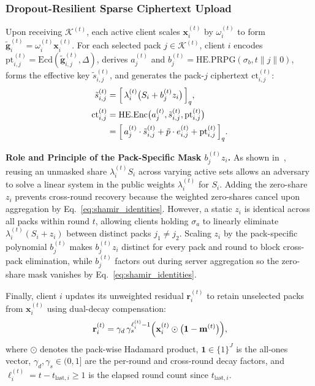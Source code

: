 \subsubsection{Dropout-Resilient Sparse Ciphertext Upload}
Upon receiving $\mathcal{K}^{(t)}$, each active client scales $\mathbf{x}_i^{(t)}$ by $\omega_i^{(t)}$ to form $\tilde{\mathbf{g}}_i^{(t)} = \omega_i^{(t)} \mathbf{x}_i^{(t)}$. For each selected pack $j \in \mathcal{K}^{(t)}$, client $i$ encodes $\mathrm{pt}_{i,j}^{(t)} = \mathrm{Ecd}(\tilde{\mathbf{g}}_{i,j}^{(t)}, \Delta)$, derives $a_j^{(t)}$ and $b_j^{(t)} = \mathrm{HE.PRPG}(\sigma_b, t \parallel j \parallel 0)$, forms the effective key $\tilde{s}_{i,j}^{(t)}$, and generates the pack-$j$ ciphertext $\mathrm{ct}_{i,j}^{(t)}$:
\begin{equation}
\begin{aligned}
\tilde{s}_{i,j}^{(t)} &= \Bigl[\, \lambda_i^{(t)} \bigl(S_i + b_j^{(t)} z_i\bigr) \,\Bigr]_q, \\
\mathrm{ct}_{i,j}^{(t)} &= \mathrm{HE.Enc}\bigl(a_j^{(t)}, \tilde{s}_{i,j}^{(t)}, \mathrm{pt}_{i,j}^{(t)}\bigr) \\
&= \Bigl[\, a_j^{(t)} \cdot \tilde{s}_{i,j}^{(t)} + \tilde{p} \cdot e_{i,j}^{(t)} + \mathrm{pt}_{i,j}^{(t)} \,\Bigr]_q.
\end{aligned}
\label{eq:effective-key-enc}
\end{equation}

\textbf{Role and Principle of the Pack-Specific Mask $b_j^{(t)} z_i$.} As shown in~\cite{colin2026tfhesd}, reusing an unmasked share $\lambda_i^{(t)} S_i$ across varying active sets allows an adversary to solve a linear system in the public weights $\lambda_i^{(t)}$ for $S_i$. Adding the zero-share $z_i$ prevents cross-round recovery because the weighted zero-shares cancel upon aggregation by Eq.~\eqref{eq:shamir_identities}. However, a static $z_i$ is identical across all packs within round $t$, allowing clients holding $\sigma_a$ to linearly eliminate $\lambda_i^{(t)}(S_i + z_i)$ between distinct packs $j_1 \neq j_2$. Scaling $z_i$ by the pack-specific polynomial $b_j^{(t)}$ makes $b_j^{(t)} z_i$ distinct for every pack and round to block cross-pack elimination, while $b_j^{(t)}$ factors out during server aggregation so the zero-share mask vanishes by Eq.~\eqref{eq:shamir_identities}.


Finally, client $i$ updates its unweighted residual $\mathbf{r}_i^{(t)}$ to retain unselected packs from $\mathbf{x}_i^{(t)}$ using dual-decay compensation:
\begin{equation}
\mathbf{r}_i^{(t)} = \gamma_d \,\gamma_s^{\ell_i^{(t)}-1}\Bigl(\mathbf{x}_i^{(t)} \odot \bigl(\mathbf{1} - \mathbf{m}^{(t)}\bigr)\Bigr),
\label{eq:dual-residual-update}
\end{equation}
where $\odot$ denotes the pack-wise Hadamard product, $\mathbf{1} \in \{1\}^J$ is the all-ones vector, $\gamma_d, \gamma_s \in (0, 1]$ are the per-round and cross-round decay factors, and $\ell_i^{(t)} = t - t_{\mathrm{last},i} \ge 1$ is the elapsed round count since $t_{\mathrm{last},i}$.

